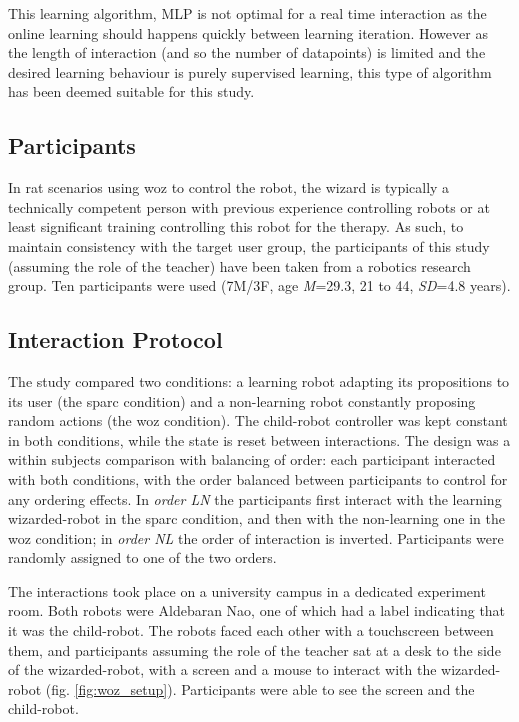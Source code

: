 This learning algorithm, MLP is not optimal for a real time interaction as the online learning should happens quickly between learning iteration. However as the length of interaction (and so the number of datapoints) is limited and the desired learning behaviour is purely supervised learning, this type of algorithm has been deemed suitable for this study.

\subsection{Participants}

In \gls{rat} scenarios using \gls{woz} to control the robot, the wizard is typically a technically competent person with previous experience controlling robots or at least significant training controlling this robot for the therapy. As such, to maintain consistency with the target user group, the participants of this study (assuming the role of the teacher) have been taken from a robotics research group. Ten participants were used (7M/3F, age \textit{M}=29.3, 21 to 44, \textit{SD}=4.8 years).

\subsection{Interaction Protocol}

The study compared two conditions: a learning robot adapting its propositions to its user (the \gls{sparc} condition) and a non-learning robot constantly proposing random actions (the \gls{woz} condition). The child-robot controller was kept constant in both conditions, while the state is reset between interactions. The design was a within subjects comparison with balancing of order: each participant interacted with both conditions, with the order balanced between participants to control for any ordering effects. In \textit{order LN} the participants first interact with the learning wizarded-robot in the \gls{sparc} condition, and then with the non-learning one in the \gls{woz} condition; in \textit{order NL} the order of interaction is inverted. Participants were randomly assigned to one of the two orders.

The interactions took place on a university campus in a dedicated experiment room. Both robots were Aldebaran Nao, one of which had a label indicating that it was the child-robot. The robots faced each other with a touchscreen between them, and participants assuming the role of the teacher sat at a desk to the side of the wizarded-robot, with a screen and a mouse to interact with the wizarded-robot (fig. \ref{fig:woz_setup}). Participants were able to see the screen and the child-robot.


